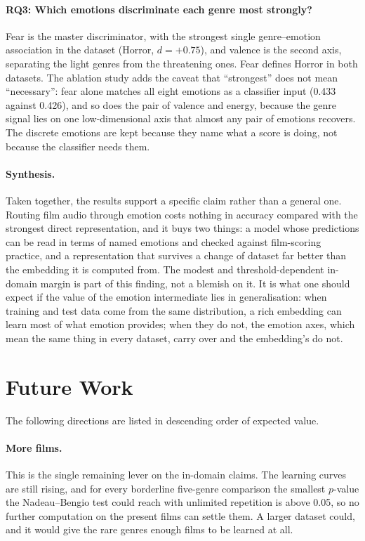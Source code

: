 \paragraph{RQ3: Which emotions discriminate each genre most strongly?}
Fear is the master discriminator, with the strongest single genre--emotion association in
the dataset (Horror, $d=+0.75$), and valence is the second axis, separating the light genres
from the threatening ones. Fear defines Horror in both datasets. The ablation study adds the
caveat that ``strongest'' does not mean ``necessary'': fear alone matches all eight emotions
as a classifier input (0.433 against 0.426), and so does the pair of valence and energy,
because the genre signal lies on one low-dimensional axis that almost any pair of emotions
recovers. The discrete emotions are kept because they name what a score is doing, not
because the classifier needs them.

\paragraph{Synthesis.}
Taken together, the results support a specific claim rather than a general one. Routing
film audio through emotion costs nothing in accuracy compared with the strongest direct
representation, and it buys two things: a model whose predictions can be read in terms of
named emotions and checked against film-scoring practice, and a representation that
survives a change of dataset far better than the embedding it is computed from. The modest
and threshold-dependent in-domain margin is part of this finding, not a blemish on it. It is
what one should expect if the value of the emotion intermediate lies in generalisation: when
training and test data come from the same distribution, a rich embedding can learn most of
what emotion provides; when they do not, the emotion axes, which mean the same thing in every
dataset, carry over and the embedding's do not.

\section{Future Work}
\label{sec:futurework}

The following directions are listed in descending order of expected value.

\paragraph{More films.} This is the single remaining lever on the in-domain claims. The
learning curves are still rising, and for every borderline five-genre comparison the
smallest $p$-value the Nadeau--Bengio test could reach with unlimited repetition is above
0.05, so no further computation on the present films can settle them. A larger dataset
could, and it would give the rare genres enough films to be learned at all.

